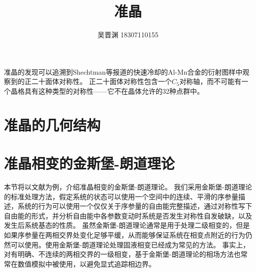 \documentclass[hyperref, UTF8, a4paper]{ctexart}
\title{准晶}
\author{吴晋渊 18307110155}
\date{}
\begin{document}
\maketitle

准晶的发现可以追溯到Shechtman等报道的快速冷却的Al-Mn合金的衍射图样中观察到的正二十面体对称性\cite{PhysRevLett.53.1951}。
正二十面体对称性包含一个$C_5$对称轴，而不可能有一个晶格具有这种类型的对称性——它不在晶体允许的32种点群中\cite{Johnston_1960}。

\section{准晶的几何结构}



\section{准晶相变的金斯堡-朗道理论}

本节将以文献\cite{PhysRevB.32.5764}为例，介绍准晶相变的金斯堡-朗道理论。
我们采用金斯堡-朗道理论的标准处理方法，假定系统的状态可以使用一个空间中的连续、平滑的序参量描述，系统的行为可以使用一个仅仅关于序参量的自由能完整描述，通过对称性写下自由能的形式，并分析自由能中各参数变动时系统是否发生对称性自发破缺，以及发生后系统基态的性质。
虽然金斯堡-朗道理论通常是用于处理二级相变的，但是如果序参量在两相交界处变化足够平缓，从而能够保证系统在相变点附近的行为仍然可以使用。使用金斯堡-朗道理论处理固液相变已经成为常见的方法\cite{fabrizio2008,PhysRevB.90.104101}。
事实上，对有明确、不连续的两相交界的一级相变，基于金斯堡-朗道理论的相场方法\cite{provatas2011phase}也常常在数值模拟中被使用，以避免显式追踪相边界\cite{boettinger2002phase}。
\end{document}
